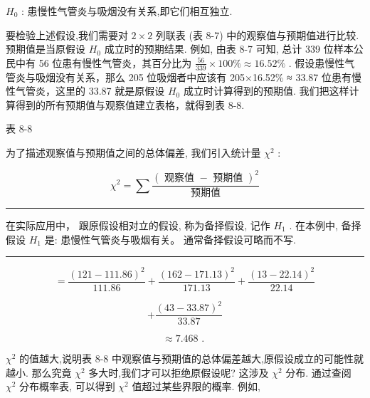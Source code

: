 \documentclass[10pt]{article}
\newcommand{\HRule}{\begin{center}\rule{0.9\linewidth}{0.2mm}\end{center}}
\begin{document}
\({H}_{0}\) : 患慢性气管炎与吸烟没有关系,即它们相互独立.

要检验上述假设,我们需要对 \(2 \times  2\) 列联表 (表 8-7) 中的观察值与预期值进行比较. 预期值是当原假设 \({H}_{0}\) 成立时的预期结果. 例如, 由表 8-7 可知, 总计 339 位样本公民中有 56 位患有慢性气管炎，其百分比为 \(\frac{56}{339} \times  {100}\%  \approx  {16.52}\%\) . 假设患慢性气管炎与吸烟没有关系，那么 205 位吸烟者中应该有 205×16.52\% ≈ 33.87 位患有慢性气管炎，这里的 33.87 就是原假设 \({H}_{0}\) 成立时计算得到的预期值. 我们把这样计算得到的所有预期值与观察值建立表格，就得到表 8-8.

表 8-8

\begin{center}
\end{center}

为了描述观察值与预期值之间的总体偏差, 我们引入统计量 \({\mathcal{\chi }}^{2}\) :

\[
{\chi }^{2} = \sum \frac{{\left( \text{ 观察值 } - \text{ 预期值 }\right) }^{2}}{\text{ 预期值 }}
\]

\HRule

在实际应用中， 跟原假设相对立的假设, 称为备择假设, 记作 \({H}_{1}\) . 在本例中, 备择假设 \({H}_{1}\) 是: 患慢性气管炎与吸烟有关。 通常备择假设可略而不写.

\HRule



\[
= \frac{{\left( {121} - {111.86}\right) }^{2}}{111.86} + \frac{{\left( {162} - {171.13}\right) }^{2}}{171.13} + \frac{{\left( {13} - {22.14}\right) }^{2}}{22.14}
\]

\[
+ \frac{{\left( {43} - {33.87}\right) }^{2}}{33.87}
\]

\[
\approx  {7.468}\text{ . }
\]

\({\chi }^{2}\) 的值越大,说明表 8-8 中观察值与预期值的总体偏差越大,原假设成立的可能性就越小. 那么究竟 \({\chi }^{2}\) 多大时,我们才可以拒绝原假设呢? 这涉及 \({\chi }^{2}\) 分布. 通过查阅 \({\chi }^{2}\) 分布概率表, 可以得到 \({\chi }^{2}\) 值超过某些界限的概率. 例如,
\end{document}
